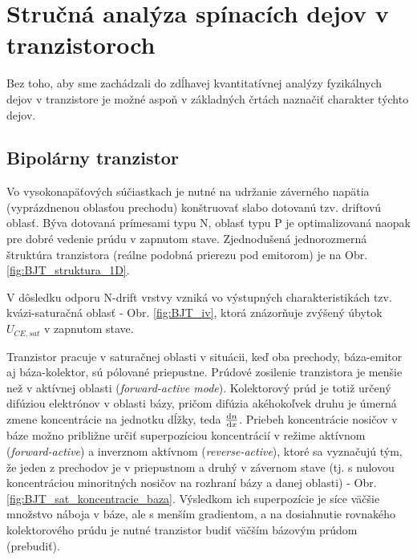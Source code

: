 \section{Stručná analýza spínacích dejov v tranzistoroch} \label{sec:analyza}



Bez toho, aby sme zachádzali do zdĺhavej kvantitatívnej analýzy fyzikálnych dejov v tranzistore je možné aspoň v základných črtách naznačiť charakter týchto dejov.

\subsection{Bipolárny tranzistor}

Vo vysokonapäťových súčiastkach je nutné na udržanie záverného napätia (vyprázdnenou oblasťou prechodu) konštruovať slabo dotovanú tzv. driftovú oblasť. Býva dotovaná prímesami typu N, oblasť typu P je optimalizovaná naopak pre dobré vedenie prúdu v zapnutom stave.
Zjednodušená jednorozmerná štruktúra tranzistora (reálne podobná prierezu pod emitorom) je na Obr. \ref{fig:BJT_struktura_1D}.


V dôsledku odporu N-drift vrstvy vzniká vo výstupných charakteristikách tzv. kvázi-saturačná oblasť - Obr. \ref{fig:BJT_iv}, ktorá znázorňuje zvýšený úbytok $U_{CE,sat}$ v zapnutom stave.



Tranzistor pracuje v saturačnej oblasti v situácii, keď oba prechody, báza-emitor aj báza-kolektor, sú pólované priepustne. Prúdové zosilenie tranzistora je menšie než v aktívnej oblasti (\textit{forward-active mode}). Kolektorový prúd je totiž určený difúziou elektrónov v oblasti bázy, pričom difúzia akéhokoľvek druhu je úmerná zmene koncentrácie na jednotku dĺžky, teda $\frac{\mathrm{d} n}{\mathrm{d} x}$. Priebeh koncentrácie nosičov v báze možno približne určiť superpozíciou koncentrácií v režime aktívnom (\textit{forward-active}) a inverznom aktívnom (\textit{reverse-active}), ktoré sa vyznačujú tým, že jeden z prechodov je v priepustnom a druhý v závernom stave (tj. s nulovou koncentráciou minoritných nosičov na rozhraní bázy a danej oblasti) - Obr. \ref{fig:BJT_sat_koncentracie_baza}. Výsledkom ich superpozície je síce väčšie množstvo náboja v báze, ale s menším gradientom, a na dosiahnutie rovnakého kolektorového prúdu je nutné tranzistor budiť väčším bázovým prúdom (prebudiť). 


